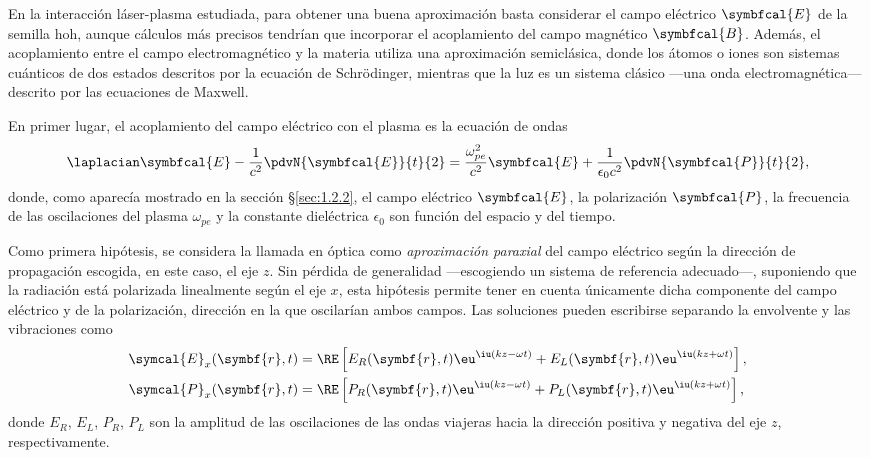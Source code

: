 En la interacción láser-plasma estudiada, para obtener una buena aproximación basta considerar el campo eléctrico $\symbfcal{E}$ de la semilla \acrshort{hoh}, aunque cálculos más precisos tendrían que incorporar el acoplamiento del campo magnético $\symbfcal{B}$. Además, el acoplamiento entre el campo electromagnético y la materia utiliza una aproximación semiclásica, donde los átomos o iones son sistemas cuánticos de dos estados descritos por la ecuación de Schrödinger, mientras que la luz es un sistema clásico ---una onda electromagnética--- descrito por las ecuaciones de Maxwell. 

En primer lugar, el acoplamiento del campo eléctrico con el plasma es la ecuación de ondas 
\begin{equation}\label{eq:3.1}
  \laplacian \symbfcal{E} - \frac{1}{c^{2}}\pdvN{\symbfcal{E}}{t}{2} = \frac{\omega^{2}_{pe}}{c^{2}}\symbfcal{E} + \frac{1}{\epsilon_{0}c^{2}}\pdvN{\symbfcal{P}}{t}{2},
\end{equation}
donde, como aparecía mostrado en la sección \S\ref{sec:1.2.2}, el campo eléctrico $\symbfcal{E}$, la polarización $\symbfcal{P}$, la frecuencia de las oscilaciones del plasma $\omega_{pe}$ y la constante dieléctrica $\epsilon_{0}$ son función del espacio y del tiempo. 

Como primera hipótesis, se considera la llamada en óptica\autocite{Born2019} como \emph{aproximación paraxial} del campo eléctrico según la dirección de propagación escogida, en este caso, el eje $z$. Sin pérdida de generalidad ---escogiendo un sistema de referencia adecuado---, suponiendo que la radiación está polarizada linealmente según el eje $x$, esta hipótesis permite tener en cuenta únicamente dicha componente del campo eléctrico y de la polarización, dirección en la que oscilarían ambos campos. Las soluciones pueden escribirse separando la envolvente y las vibraciones como
\begin{align}
  \label{eq:3.2a}
  \symcal{E}_{x}(\symbf{r},t) &= \RE \left[E_{R}(\symbf{r},t)\eu^{\iu (kz - \omega t)} + E_{L}(\symbf{r},t)\eu^{\iu (kz + \omega t)}\right], \\
  \label{eq:3.2b}
  \symcal{P}_{x}(\symbf{r},t) &= \RE \left[P_{R}(\symbf{r},t)\eu^{\iu (kz - \omega t)} + P_{L}(\symbf{r},t)\eu^{\iu (kz + \omega t)}\right], 
\end{align}
donde $E_{R}$, $E_{L}$, $P_{R}$, $P_{L}$ son la amplitud de las oscilaciones de las ondas viajeras hacia la dirección positiva y negativa del eje $z$, respectivamente. 

